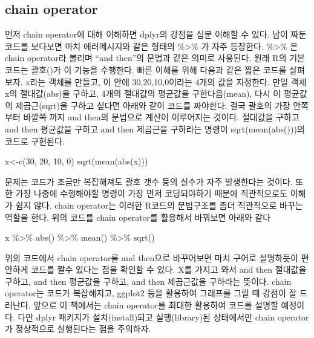 \documentclass[
]{book}
\newenvironment{Shaded}{\begin{snugshade}}{\end{snugshade}}
\newcommand{\DecValTok}[1]{\textcolor[rgb]{0.00,0.00,0.81}{#1}}
\newcommand{\FunctionTok}[1]{\textcolor[rgb]{0.00,0.00,0.00}{#1}}
\newcommand{\NormalTok}[1]{#1}
\newcommand{\OtherTok}[1]{\textcolor[rgb]{0.56,0.35,0.01}{#1}}
\newcommand{\SpecialCharTok}[1]{\textcolor[rgb]{0.00,0.00,0.00}{#1}}
\theoremstyle{definition}
\theoremstyle{definition}
\theoremstyle{definition}
\theoremstyle{definition}
\theoremstyle{remark}
\begin{document}
\hypertarget{chain-operator}{%
\subsection{chain operator}\label{chain-operator}}

먼저 chain operator에 대해 이해하면 dplyr의 강점을 십분 이해할 수 있다. 남이 짜둔 코드를 보다보면 마치 에러메시지와 같은 형태의 \%\textgreater\% 가 자주 등장한다. \%\textgreater\% 은 chain operator라 불리며 ``and then''의 문법과 같은 의미로 사용된다. 원래 R의 기본 코드는 괄호()가 이 기능을 수행한다.
빠른 이해를 위해 다음과 같은 짧은 코드를 살펴보자. x라는 객체를 만들고, 이 안에 30,20,10,0이라는 4개의 값을 지정한다. 만일 객체 x의 절대값(abs)을 구하고, 4개의 절대값의 평균값을 구한다음(mean), 다시 이 평균값의 제곱근(sqrt)을 구하고 싶다면 아래와 같이 코드를 짜야한다. 결국 괄호의 가장 안쪽부터 바깥쪽 까지 and then의 문법으로 계산이 이루어지는 것이다. 절대값을 구하고 and then 평균값을 구하고 and then 제곱근을 구하라는 명령이 sqrt(mean(abs()))의 코드로 구현된다.

\begin{Shaded}
\begin{Highlighting}[]
\NormalTok{x}\OtherTok{\textless{}{-}}\FunctionTok{c}\NormalTok{(}\DecValTok{30}\NormalTok{, }\DecValTok{20}\NormalTok{, }\DecValTok{10}\NormalTok{, }\DecValTok{0}\NormalTok{)}
\FunctionTok{sqrt}\NormalTok{(}\FunctionTok{mean}\NormalTok{(}\FunctionTok{abs}\NormalTok{(x)))}
\end{Highlighting}
\end{Shaded}

문제는 코드가 조금만 복잡해져도 괄호 갯수 등의 실수가 자주 발생한다는 것이다. 또한 가장 나중에 수행해야할 명령이 가장 먼저 코딩되야하기 때문에 직관적으로도 이해가 쉽지 않다. chain operator는 이러한 R코드의 문법구조를 좀더 직관적으로 바꾸는 역할을 한다. 위의 코드를 chain operator를 활용해서 바꿔보면 아래와 같다

\begin{Shaded}
\begin{Highlighting}[]
\NormalTok{x }\SpecialCharTok{\%\textgreater{}\%} 
  \FunctionTok{abs}\NormalTok{() }\SpecialCharTok{\%\textgreater{}\%} 
  \FunctionTok{mean}\NormalTok{() }\SpecialCharTok{\%\textgreater{}\%} 
  \FunctionTok{sqrt}\NormalTok{()}
\end{Highlighting}
\end{Shaded}

위의 코드에서 chain operator를 and then으로 바꾸어보면 마치 구어로 설명하듯이 편안하게 코드를 짤수 있다는 점을 확인할 수 있다. X를 가지고 와서 and then 절대값을 구하고, and then 평균값을 구하고, and then 제곱근값을 구하라는 뜻이다. chain operator는 코드가 복잡해지고, ggplot2 등을 활용하여 그래프를 그릴 때 강점이 잘 드러난다. 앞으로 이 책에서는 chain operator를 최대한 활용하여 코드를 설명할 예정이다. 다만 dplyr 패키지가 설치(install)되고 실행(library)된 상태에서만 chain operator가 정상적으로 실행된다는 점을 주의하자.
\end{document}
